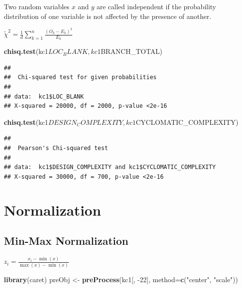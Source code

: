 \documentclass[]{book}
\newenvironment{Shaded}{\begin{snugshade}}{\end{snugshade}}
\newcommand{\KeywordTok}[1]{\textcolor[rgb]{0.13,0.29,0.53}{\textbf{{#1}}}}
\newcommand{\DataTypeTok}[1]{\textcolor[rgb]{0.13,0.29,0.53}{{#1}}}
\newcommand{\DecValTok}[1]{\textcolor[rgb]{0.00,0.00,0.81}{{#1}}}
\newcommand{\StringTok}[1]{\textcolor[rgb]{0.31,0.60,0.02}{{#1}}}
\newcommand{\NormalTok}[1]{{#1}}
\begin{document}
Two random variables \(x\) and \(y\) are called independent if the
probability distribution of one variable is not affected by the presence
of another.

\(\tilde{\chi}^2=\frac{1}{d}\sum_{k=1}^{n} \frac{(O_k - E_k)^2}{E_k}\)

\begin{Shaded}
\begin{Highlighting}[]
\KeywordTok{chisq.test}\NormalTok{(kc1$LOC_BLANK,kc1$BRANCH_TOTAL)}
\end{Highlighting}
\end{Shaded}

\begin{verbatim}
## 
##  Chi-squared test for given probabilities
## 
## data:  kc1$LOC_BLANK
## X-squared = 20000, df = 2000, p-value <2e-16
\end{verbatim}

\begin{Shaded}
\begin{Highlighting}[]
\KeywordTok{chisq.test}\NormalTok{(kc1$DESIGN_COMPLEXITY,kc1$CYCLOMATIC_COMPLEXITY)}
\end{Highlighting}
\end{Shaded}

\begin{verbatim}
## 
##  Pearson's Chi-squared test
## 
## data:  kc1$DESIGN_COMPLEXITY and kc1$CYCLOMATIC_COMPLEXITY
## X-squared = 30000, df = 700, p-value <2e-16
\end{verbatim}

\section{Normalization}\label{normalization-1}

\subsection{Min-Max Normalization}\label{min-max-normalization}

\(z_i=\frac{x_i-\min(x)}{\max(x)-\min(x)}\)

\begin{Shaded}
\begin{Highlighting}[]
\KeywordTok{library}\NormalTok{(caret)}
\NormalTok{preObj <-}\StringTok{ }\KeywordTok{preProcess}\NormalTok{(kc1[, -}\DecValTok{22}\NormalTok{], }\DataTypeTok{method=}\KeywordTok{c}\NormalTok{(}\StringTok{"center"}\NormalTok{, }\StringTok{"scale"}\NormalTok{))}
\end{Highlighting}
\end{Shaded}
\end{document}
